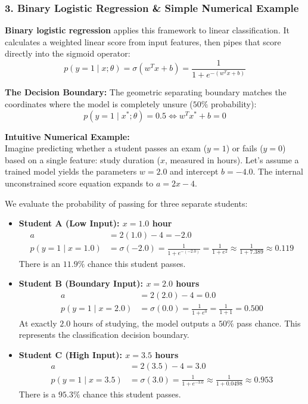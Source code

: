 \documentclass{article}
\begin{document}
\subsubsection*{3. Binary Logistic Regression \& Simple Numerical Example}
\textbf{Binary logistic regression} applies this framework to linear classification. It calculates a weighted linear score from input features, then pipes that score directly into the sigmoid operator:
\begin{equation}
    p(y = 1 \mid x; \theta) = \sigma(w^T x + b) = \frac{1}{1 + e^{-(w^T x + b)}}
\end{equation}

\noindent \textbf{The Decision Boundary:} The geometric separating boundary matches the coordinates where the model is completely unsure ($50\%$ probability):
\begin{equation}
    p(y = 1 \mid x^*; \theta) = 0.5 \iff w^T x^* + b = 0
\end{equation}

\noindent \textbf{Intuitive Numerical Example:} \\
Imagine predicting whether a student passes an exam ($y=1$) or fails ($y=0$) based on a single feature: study duration ($x$, measured in hours). Let's assume a trained model yields the parameters $w = 2.0$ and intercept $b = -4.0$. The internal unconstrained score equation expands to $a = 2x - 4$.

We evaluate the probability of passing for three separate students:
\begin{itemize}
    \item \textbf{Student A (Low Input): $x = 1.0$ hour}
    \begin{align}
        a &= 2(1.0) - 4 = -2.0 \\
        p(y=1 \mid x=1.0) &= \sigma(-2.0) = \frac{1}{1 + e^{-(-2.0)}} = \frac{1}{1 + e^2} \approx \frac{1}{1 + 7.389} \approx \mathbf{0.119}
    \end{align}
    There is an $11.9\%$ chance this student passes.
    
    \item \textbf{Student B (Boundary Input): $x = 2.0$ hours}
    \begin{align}
        a &= 2(2.0) - 4 = 0.0 \\
        p(y=1 \mid x=2.0) &= \sigma(0.0) = \frac{1}{1 + e^{0}} = \frac{1}{1 + 1} = \mathbf{0.500}
    \end{align}
    At exactly $2.0$ hours of studying, the model outputs a $50\%$ pass chance. This represents the classification decision boundary.
    
    \item \textbf{Student C (High Input): $x = 3.5$ hours}
    \begin{align}
        a &= 2(3.5) - 4 = 3.0 \\
        p(y=1 \mid x=3.5) &= \sigma(3.0) = \frac{1}{1 + e^{-3.0}} \approx \frac{1}{1 + 0.0498} \approx \mathbf{0.953}
    \end{align}
    There is a $95.3\%$ chance this student passes.
\end{itemize}
\end{document}
